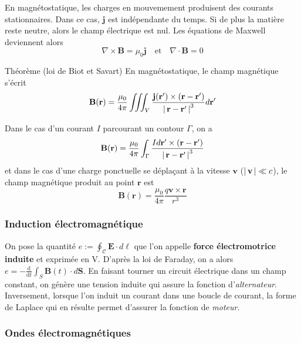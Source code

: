         En magnétostatique, les charges en mouvemement produisent des courants stationnaires. Dans ce cas, $\mathbf{j}$ est indépendante du temps. Si de plus la matière reste neutre, alors le champ électrique est nul. Les équations de Maxwell deviennent alors 
        \[ \nabla \times \mathbf{B} = \mu_0 \mathbf{j} \quad \text{et} \quad \nabla \cdot \mathbf{B} = 0 \]   
        \begin{omed}{Théorème (loi de Biot et Savart)}
            En magnétostatique, le champ magnétique s’écrit
            \[ \mathbf{B}(\mathbf{r}) = \frac{\mu_0}{4 \pi} \iiint_V \frac{\mathbf{j}(\mathbf{r}') \times (\mathbf{r} - \mathbf{r}')}{\left\lvert \, \mathbf{r} - \mathbf{r}' \, \right\rvert^3} d\mathbf{r}' \]
        \end{omed}
        Dans le cas d’un courant $I$ parcourant un contour $\Gamma$, on a 
        \[ \mathbf{B}(\mathbf{r}) = \frac{\mu_0}{4 \pi} \int_{\Gamma} \frac{I d\mathbf{r}' \times (\mathbf{r} - \mathbf{r}')}{\left\lvert \, \mathbf{r} - \mathbf{r}' \, \right\rvert^3} \]
        et dans le cas d’une charge ponctuelle se déplaçant à la vitesse $\mathbf{v}$ ($\left\lvert \, \mathbf{v} \, \right\rvert \ll c$), le champ magnétique produit au point $\mathbf{r}$ est 
        \[ \mathbf{B}(\mathbf{r}) = \frac{\mu_0}{4 \pi} \frac{q \mathbf{v} \times \mathbf{r}}{r^3} \]  
        
        \subsubsection{Induction électromagnétique}

        On pose la quantité $e := \oint_{\mathcal{C}} \mathbf{E} \cdot d\ell$ que l’on appelle \textbf{force électromotrice induite} et exprimée en V. D’après la loi de Faraday, on a alors $e = - \frac{\text{d}}{\text{d}t} \int_{S} \mathbf{B}(t) \cdot d\mathbf{S}$. En faisant tourner un circuit électrique dans un champ constant, on génère une tension induite qui assure la fonction d’\textit{alternateur}. Inversement, lorsque l’on induit un courant dans une boucle de courant, la forme de Laplace qui en résulte permet d’assurer la fonction de \textit{moteur}.

        \subsubsection{Ondes électromagnétiques}

